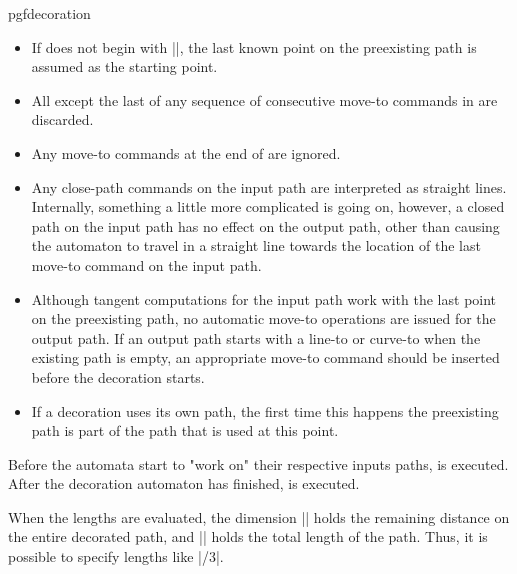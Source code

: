 \begin{environment}{{pgfdecoration}}
  \begin{itemize}
  \item
    If  does not begin with
    |\pgfpathmoveto|, the last known point on the preexisting path is
    assumed as the starting point.
  \item
    All except the last of any sequence of consecutive move-to commands
    in  are discarded.
  \item
    Any move-to commands at the end of  are
    ignored.
  \item
    Any close-path commands on the input path are interpreted as
    straight lines.
    Internally, something a little more complicated is going on,
    however, a closed path on the input path has no effect on the
    output path, other than causing the automaton to travel in a
    straight line towards the location of the last move-to command on
    the input path.
  \item
    Although tangent computations for the input path work with the
    last point on the preexisting path, no automatic move-to
    operations are issued for the output path.
    If an output path starts with a line-to or curve-to when the
    existing path is empty, an appropriate move-to command should be
    inserted before the decoration starts.
  \item
    If a decoration uses its own path, the first time this happens the
    preexisting path is part of the path that is used at this point.
  \end{itemize}

Before the automata start to "work on" their respective inputs paths,
   is
  executed. After the decoration automaton has finished,  is executed.

\begin{codeexample}[]
\end{codeexample}

  When the lengths are evaluated, the dimension
  |\pgfdecoratedremainingdistance| holds the remaining distance on
  the entire decorated path, and |\pgfdecoratedpathlength| holds the
  total length of the path. Thus, it is possible to specify lengths
  like |\pgfdecoratedpathlength/3|.


\end{environment}
